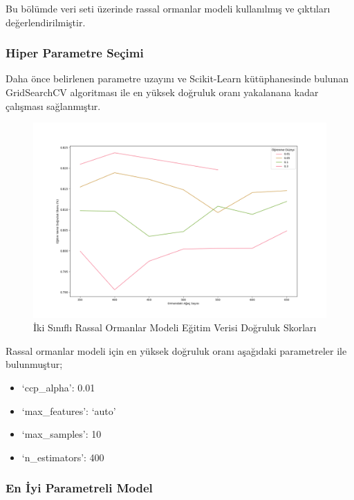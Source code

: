 \documentclass[12pt,twoside]{deuthesis}
\providecommand{\tightlist}{%
  \setlength{\itemsep}{0pt}\setlength{\parskip}{0pt}}
\begin{document}
Bu bölümde veri seti üzerinde rassal ormanlar modeli kullanılmış ve çıktıları değerlendirilmiştir.

\hypertarget{hiper-parametre-seuxe7imi-5}{%
\subsubsection{Hiper Parametre Seçimi}\label{hiper-parametre-seuxe7imi-5}}

Daha önce belirlenen parametre uzayını ve Scikit-Learn kütüphanesinde bulunan GridSearchCV algoritması ile en yüksek doğruluk oranı yakalanana kadar çalışması sağlanmıştır.
\begin{figure}

{\centering \includegraphics[width=1.1\linewidth,height=0.55\textheight]{figure/RF_bin_Grid_Graph} 

}

\caption{İki Sınıflı Rassal Ormanlar Modeli Eğitim Verisi Doğruluk Skorları}\label{fig:unnamed-chunk-60}
\end{figure}
Rassal ormanlar modeli için en yüksek doğruluk oranı aşağıdaki parametreler ile bulunmuştur;
\begin{itemize}
\tightlist
\item
  `ccp\_alpha': 0.01\\
\item
  `max\_features': `auto'\\
\item
  `max\_samples': 10\\
\item
  `n\_estimators': 400\\
  \newpage  
\end{itemize}
\hypertarget{en-iyi-parametreli-model-3}{%
\subsubsection{En İyi Parametreli Model}\label{en-iyi-parametreli-model-3}}
\end{document}
